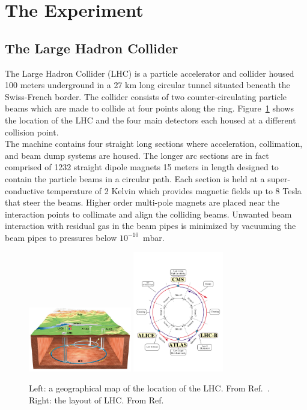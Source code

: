 \clearpage
\section{The Experiment}

\subsection{The Large Hadron Collider\label{sec:lhc}}

The Large Hadron Collider (LHC) is a particle accelerator and collider
housed 100 meters underground in a 27 km long circular tunnel situated 
beneath the Swiss-French border. The collider consists of two 
counter-circulating particle beams which are made to collide at four points 
along the ring. Figure~\ref{fig:lhc} shows the location of the LHC and 
the four main detectors each housed at a different collision point.\\
\indent The machine contains four straight long sections where acceleration, 
collimation, and beam dump systems are housed. The longer arc sections are
in fact comprised of 1232 straight dipole magnets 15 meters in length designed to contain 
the particle beams in a circular path. Each section is held at a 
super-conductive temperature of 2 Kelvin which provides magnetic fields up to 8
Tesla that steer the beams. Higher order multi-pole magnets are 
placed near the interaction points to collimate and align the 
colliding beams. Unwanted beam interaction with residual gas in the beam pipes
is minimized by vacuuming the beam pipes to pressures below $10^{-10}$~mbar.

\begin{figure}[h!]
  \begin{center}
      \includegraphics[width=0.40\textwidth,]{figures/CERNMap.jpg}
      \includegraphics[width=0.35\textwidth,]{figures/lhc-pho-1997-060.jpg}
      \caption{\label{fig:lhc} Left: a geographical map of the location of the LHC. From Ref.~\cite{Vittorio:842700}. Right: 
      the layout of LHC. From Ref.~\cite{Jean-Luc:841573}}
  \end{center}
\end{figure}

